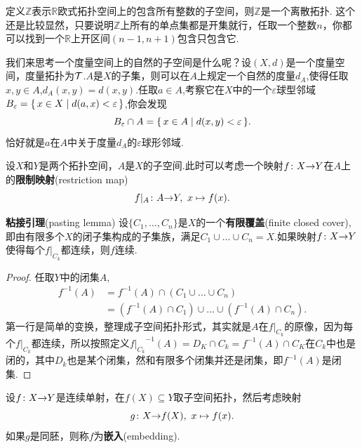 \begin{example}
定义$\mathbb{Z}$表示$\mathbb{R}$欧式拓扑空间上的包含所有整数的子空间，则$\mathbb{Z}$是一个离散拓扑. 这个还是比较显然，只要说明$\mathbb{Z}$上所有的单点集都是开集就行，任取一个整数$n$，你都可以找到一个$\mathbb{R}$上开区间$(n-1,n+1)$包含只包含它.
\end{example}


\begin{example}
我们来思考一个度量空间上的自然的子空间是什么呢？设$(X,d)$是一个度量空间，度量拓扑为$\mathcal{T}$.$A$是$X$的子集，则可以在$A$上规定一个自然的度量$d_A$,使得任取$x,y \in A$,$d_A(x,y)=d(x,y)$.任取$a \in A$,考察它在$X$中的一个$\varepsilon$球型邻域$B_\varepsilon=\{\,x \in X\mid d(a,x) < \varepsilon\,\}$,你会发现\[B_\varepsilon \cap A = \{\,x \in A\mid d(x,y) < \varepsilon\,\}.\]恰好就是$a$在$A$中关于度量$d_A$的$\varepsilon$球形邻域.	
\end{example}


\begin{example}
设$X$和$Y$是两个拓扑空间，$A$是$X$的子空间.此时可以考虑一个映射${f}\colon{X}{\to}{Y}$在$A$上的\textbf{限制映射}(restriction map)\[{f|_A}\colon{A}{\to}{Y},\ x \mapsto f(x).\]
\end{example}

\begin{lemma}
\textbf{粘接引理}(pasting lemma) 设$\{C_1,\ldots,C_n\}$是$X$的一个\textbf{有限覆盖}(finite closed cover),即由有限多个$X$的闭子集构成的子集族，满足$C_1 \cup \ldots \cup C_n=X$.如果映射${f}\colon{X}{\to}{Y}$使得每个$f|_{C_k}$都连续，则$f$连续.
\end{lemma}

\begin{proof}
任取$Y$中的闭集$A$,\[\begin{aligned} 
					f^{-1}(A)&=f^{-1}(A) \cap (C_1 \cup \ldots \cup C_n)\\
					&=(f^{-1}(A) \cap C_1) \cup \ldots \cup (f^{-1}(A) \cap C_n).\end{aligned}\]第一行是简单的变换，整理成子空间拓扑形式，其实就是$A$在$f|_{C_k}$的原像，因为每个$f|_{C_k}$都连续，所以按照定义${f|_{C_k}}^{-1}(A)=D_K \cap C_k = f^{-1}({A}) \cap C_K $在$C_k$中也是闭的，其中$D_k$也是某个闭集，然和有限多个闭集并还是闭集，即$f^{-1}(A)$是闭集.
\end{proof}

\begin{definition}
设${f}\colon{X}{\to}{Y}$是连续单射，在$f(X) \subseteq Y$取子空间拓扑，然后考虑映射\[{g}\colon{X}{\to}{f(X)},\ x \mapsto f(x).\]如果$g$是同胚，则称$f$为\textbf{嵌入}(embedding).
\end{definition}

